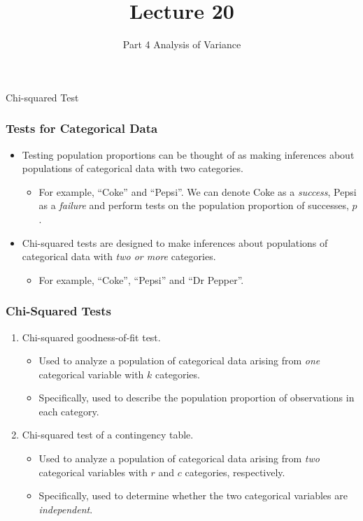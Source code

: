 \documentclass[12pt]{beamer}
\title[ECON2843]{Lecture 20}
\subtitle{Part 4 Analysis of Variance}
\date{}
\begin{document}
	\begin{frame}
		\titlepage

	\end{frame}
	\begin{frame}
		\vspace{1cm}
		\centering
		{\color{blue}\large Chi-squared Test}
	\end{frame}

		
		\begin{frame}
			\frametitle{Tests for Categorical Data}
			
			\begin{itemize}[label={\color{blue}$\blacktriangleright$}]
				\item Testing population proportions can be thought of as making inferences about populations of categorical data with two categories.
				\begin{itemize}[label={\color{blue}$\blacktriangleright$}]
					\item For example, ``Coke'' and ``Pepsi''. We can denote Coke as a \emph{success}, Pepsi as a \emph{failure} and perform tests on the population proportion of successes, $p$.
				\end{itemize}
				\item Chi-squared tests are designed to make inferences about populations of categorical data with \emph{two or more} categories.
				\begin{itemize}[label={\color{blue}$\blacktriangleright$}]
					\item For example, ``Coke'', ``Pepsi'' and ``Dr Pepper''.
				\end{itemize}
			\end{itemize}
			
		\end{frame}
		\begin{frame}
			\frametitle{Chi-Squared Tests}
			
			\begin{enumerate}[label={\color{blue}\arabic{enumi}.}]
				\item Chi-squared goodness-of-fit test.
				\begin{itemize}[label={\color{blue}$\blacktriangleright$}]
					\item Used to analyze a population of categorical data arising from \emph{one} categorical variable with $k$ categories.
					\item Specifically, used to describe the population proportion of observations in each category.
				\end{itemize}
				
				\item Chi-squared test of a contingency table.
				\begin{itemize}[label={\color{blue}$\blacktriangleright$}]
					\item Used to analyze a population of categorical data arising from \emph{two} categorical variables with $r$ and $c$ categories, respectively.
					\item Specifically, used to determine whether the two categorical variables are \emph{independent}.
				\end{itemize}
			\end{enumerate}
			
		\end{frame}
\end{document}
